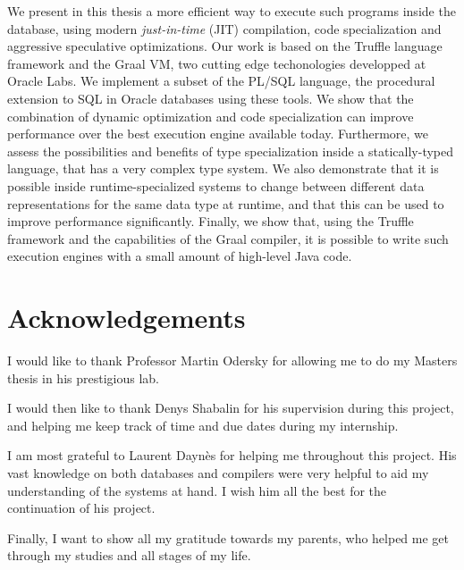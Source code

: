 \documentclass[twoside,11pt,a4paper]{article}
\begin{document}
We present in this thesis a more efficient way to execute such programs inside the database, using modern \textit{just-in-time} (JIT) compilation, code specialization and aggressive speculative optimizations. Our work is based on the Truffle language framework and the Graal VM, two cutting edge techonologies developped at Oracle Labs. We implement a subset of the PL/SQL language, the procedural extension to SQL in Oracle databases using these tools. We show that the combination of dynamic optimization and code specialization can improve performance over the best execution engine available today. Furthermore, we assess the possibilities and benefits of type specialization inside a statically-typed language, that has a very complex type system. We also demonstrate that it is possible inside runtime-specialized systems to change between different data representations for the same data type at runtime, and that this can be used to improve performance significantly. Finally, we show that, using the Truffle framework and the capabilities of the Graal compiler, it is possible to write such execution engines with a small amount of high-level Java code.


\newpage
\section*{Acknowledgements}
\label{sec:acknowledgements}

I would like to thank Professor Martin Odersky for allowing me to do my Masters thesis in his prestigious lab.

I would then like to thank Denys Shabalin for his supervision during this project, and helping me keep track of time and due dates during my internship.

I am most grateful to Laurent Daynès for helping me throughout this project. His vast knowledge on both databases and compilers were very helpful to aid my understanding of the systems at hand. I wish him all the best for the continuation of his project.

Finally, I want to show all my gratitude towards my parents, who helped me get through my studies and all stages of my life.

\newpage

\tableofcontents

\newpage
\end{document}
